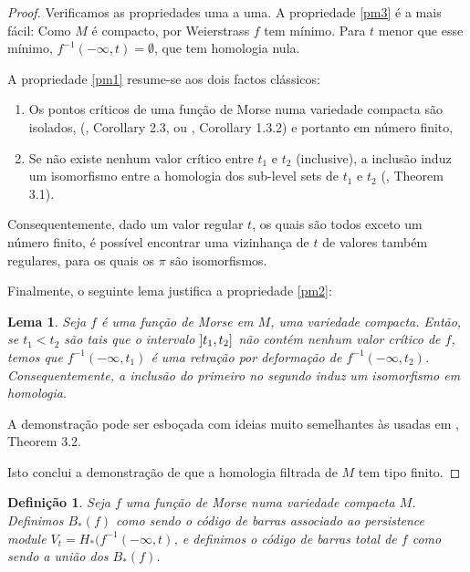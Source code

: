 \documentclass[11pt]{article}
\newtheorem{lemma}{Lema}
\newtheorem{definition}{Definição}
\theoremstyle{nonumberplain}
\newtheorem{proof}{Proof}
\begin{document}
\begin{proof}
Verificamos as propriedades uma a uma. A propriedade \ref{pm3} é a mais fácil: Como $M$ é compacto, por Weierstrass $f$ tem mínimo. Para $t$ menor que esse mínimo, $f^{-1}(-\infty,t) = \emptyset$, que tem homologia nula.

A propriedade \ref{pm1} resume-se aos dois factos clássicos:
\begin{enumerate}
\item Os pontos críticos de uma função de Morse numa variedade compacta são isolados, (\cite{milnor}, Corollary 2.3, ou \cite{audin}, Corollary 1.3.2) e portanto em número finito,
\item Se não existe nenhum valor crítico entre $t_1$ e $t_2$ (inclusive), a inclusão induz um isomorfismo entre a homologia dos sub-level sets de $t_1$ e $t_2$ (\cite{milnor}, Theorem 3.1).
\end{enumerate}

Consequentemente, dado um valor regular $t$, os quais são todos exceto um número finito, é possível encontrar uma vizinhança de $t$ de valores também regulares, para os quais os $\pi$ são isomorfismos.

Finalmente, o seguinte lema justifica a propriedade \ref{pm2}:

\begin{lemma}
Seja $f$ é uma função de Morse em $M$, uma variedade compacta. Então, se $t_1 < t_2$ são tais que o intervalo $\linterval{t_1}{t_2}$ não contém nenhum valor crítico de $f$, temos que $f^{-1}(-\infty,t_1)$ é uma retração por deformação de $f^{-1}(-\infty, t_2)$. Consequentemente, a inclusão do primeiro no segundo induz um isomorfismo em homologia.
\end{lemma}

A demonstração pode ser esboçada com ideias muito semelhantes às usadas em \cite{milnor}, Theorem 3.2.

Isto conclui a demonstração de que a homologia filtrada de $M$ tem tipo finito.
\end{proof}

\begin{definition}
Seja $f$ uma função de Morse numa variedade compacta $M$. Definimos $B_*(f)$ como sendo o código de barras associado ao persistence module $V_t = H_*(f^{-1}(-\infty,t)$, e definimos o \emph{código de barras total de $f$} como sendo a união dos $B_*(f)$.
\end{definition}
\end{document}
